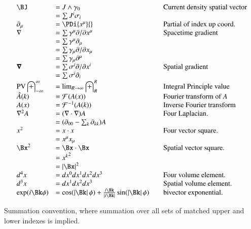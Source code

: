 \documentclass{article}
\DeclareMathOperator{\PV}{PV}
\newcommand{\FF}[0]{\mathcal{F}}
\newcommand{\IIinf}[0]{ \int_{-\infty}^\infty }
\begin{document}
\begin{equation*}
\begin{array}{l l l}
\BJ &= J \wedge \gamma_0 & \quad \mbox{Current density spatial vector} \\
    &= \sum J^i \sigma_i \\
\partial_{\mu} &= \PDi{x^\mu}{} & \quad \mbox{Partial of index up coord.} \\
\grad &= \sum \gamma^{\mu} \partial/\partial {x^{\mu}} & \quad \mbox{Spacetime gradient} \\
      &= \sum \gamma^{\mu}\partial_{\mu} \\
      &= \sum \gamma_{\mu} \partial/\partial {x_{\mu}} \\
      &= \sum \gamma_{\mu}\partial^{\mu} \\
\spacegrad &= \sum \sigma^{i} \partial/\partial{x^{i}} & \quad \mbox{Spatial gradient} \\
           &= \sum \sigma^{i}\partial_{i} \\
\PV \IIinf &= \lim_{R\rightarrow \infty} \int_{R}^R & \quad \mbox{Integral Principle value} \\
\hat{A}(k) &= \FF(A(x)) & \quad \mbox{Fourier transform of $A$} \\ 
{A}(x) &= \FF^{-1}(A(k)) & \quad \mbox{Inverse Fourier transform} \\ 
\grad^2 A
   &= (\grad \cdot \grad) A & \quad \mbox{Four Laplacian. } \\
   &= (\partial_{00} - \sum_k \partial_{kk}) A & \\
x^2 &= x \cdot x & \quad \mbox{Four vector square. } \\
    &= x^\mu x_\mu \\
\Bx^2 &= \Bx \cdot \Bx & \quad \mbox{Spatial vector square. } \\
    &= {x^k}^2 \\
    &= \Abs{\Bx}^2 \\
d^4 x &= dx^0 dx^1 dx^2 dx^3 & \quad \mbox{Four volume element. } \\
d^3 x &= dx^1 dx^2 dx^3 & \quad \mbox{Spatial volume element. } \\
\exp(i\Bk\phi) &= 
\cos(\Abs{\Bk}\phi) + \frac{i \Bk}{\Abs{i\Bk}} \sin(\Abs{\Bk}\phi) & \quad \mbox{bivector exponential. } \\
\end{array}
\end{equation*}

Summation convention, where summation over all sets of matched upper and lower indexes is implied. %



\end{document}
